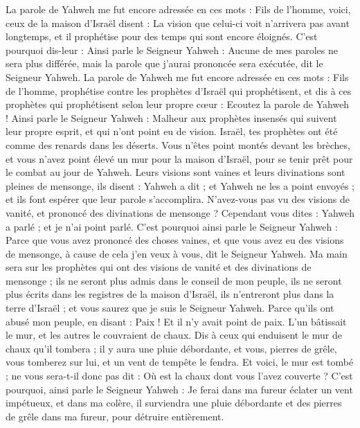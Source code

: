 \begin{multicols}{2}
La parole de Yahweh me fut encore adressée en ces mots :
Fils de l’homme, voici, ceux de la maison d'Israël disent : La vision que celui-ci voit n'arrivera pas avant longtemps, et il prophétise pour des temps qui sont encore éloignés.
C'est pourquoi dis-leur : Ainsi parle le Seigneur Yahweh : Aucune de mes paroles ne sera plus différée, mais la parole que j'aurai prononcée sera exécutée, dit le Seigneur Yahweh.
\VerseOne{}La parole de Yahweh me fut encore adressée en ces mots :
Fils de l’homme, prophétise contre les prophètes d'Israël qui prophétisent, et dis à ces prophètes qui prophétisent selon leur propre cœur : Ecoutez la parole de Yahweh !
Ainsi parle le Seigneur Yahweh : Malheur aux prophètes  insensés qui suivent leur propre esprit, et qui n'ont point eu de vision.
Israël, tes prophètes ont été comme des renards dans les déserts.
Vous n'êtes point montés devant les brèches, et vous n'avez point élevé un mur pour la maison d'Israël, pour se tenir prêt pour le combat au jour de Yahweh.
Leurs visions sont vaines et leurs divinations sont pleines de mensonge, ils disent : Yahweh a dit ; et Yahweh ne les a point envoyés ; et ils font espérer que leur parole s’accomplira\FTNT{}.
N'avez-vous pas vu des visions de vanité, et prononcé des divinations de mensonge ? Cependant vous dites : Yahweh a parlé ; et je n'ai point parlé.
C'est pourquoi ainsi parle le Seigneur Yahweh : Parce que vous avez prononcé des choses vaines, et que vous avez eu des visions de mensonge, à cause de cela j'en veux à vous, dit le Seigneur Yahweh.
Ma main sera sur les prophètes qui ont des visions de vanité et des divinations de mensonge ; ils ne seront plus admis dans le conseil de mon peuple, ils ne seront plus écrits dans les registres de la maison d'Israël, ils n'entreront plus dans la terre d'Israël ; et vous saurez que je suis le Seigneur Yahweh.
Parce qu'ils ont abusé mon peuple, en disant : Paix ! Et il n'y avait point de paix\FTNT{}. L'un bâtissait le mur, et les autres le couvraient de chaux.
Dis à ceux qui enduisent le mur de chaux qu'il tombera ; il y aura une pluie débordante, et vous, pierres de grêle, vous tomberez sur lui, et un vent de tempête le fendra.
Et voici, le mur est tombé ; ne vous sera-t-il donc pas dit : Où est la chaux dont vous l'avez couverte ?
C'est pourquoi, ainsi parle le Seigneur Yahweh : Je ferai dans ma fureur éclater un vent impétueux, et dans ma colère, il surviendra une pluie débordante et des pierres de grêle dans ma fureur, pour détruire entièrement.

\end{multicols}
